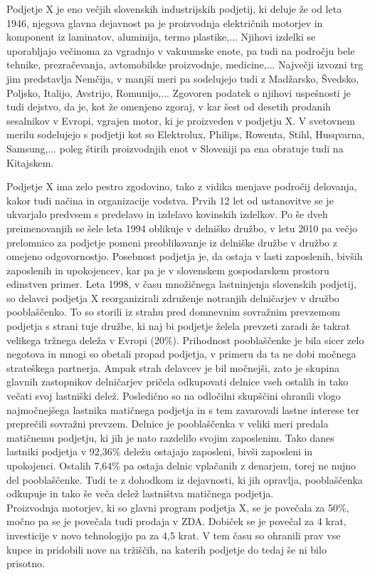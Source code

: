 \documentclass[12pt,a4paper]{amsart}
\theoremstyle{definition} %
\theoremstyle{plain} %
\begin{document}
Podjetje X je eno večjih slovenskih industrijskih podjetij, ki deluje že od leta 1946, njegova glavna dejavnost pa je proizvodnja električnih motorjev in komponent iz laminatov, aluminija, termo plastike,... Njihovi izdelki se uporabljajo večinoma za vgradnjo v vakuumske enote, pa tudi na področju bele tehnike, prezračevanja, avtomobilske proizvodnje, medicine,...
Največji izvozni trg jim predstavlja Nemčija, v manjši meri pa sodelujejo tudi z Madžarsko, Švedsko, Poljsko, Italijo, Avstrijo, Romunijo,... Zgovoren podatek o njihovi uspešnosti je tudi dejstvo, da je, kot že omenjeno zgoraj, v kar šest od desetih prodanih sesalnikov v Evropi, vgrajen motor, ki je proizveden v podjetju X. V svetovnem merilu sodelujejo s podjetji kot so Elektrolux, Philips, Rowenta, Stihl, Husqvarna, Samsung,... poleg štirih proizvodnjih enot v Sloveniji pa ena obratuje tudi na Kitajskem.\par
Podjetje X ima zelo pestro zgodovino, tako z vidika menjave področij delovanja, kakor tudi načina in organizacije vodstva. Prvih 12 let od ustanovitve se je ukvarjalo predvsem s predelavo in izdelavo kovinskih izdelkov. Po še dveh preimenovanjih se šele leta 1994 oblikuje v delniško družbo, v letu 2010 pa večjo prelomnico za podjetje pomeni preoblikovanje iz delniške družbe v družbo z omejeno odgovornostjo. Posebnost podjetja je, da ostaja v lasti zaposlenih, bivših zaposlenih in upokojencev, kar pa je v slovenskem gospodarskem prostoru edinstven primer. Leta 1998, v času množičnega lastninjenja slovenskih podjetij, so delavci podjetja X reorganizirali združenje notranjih delničarjev v družbo pooblaščenko. To so storili iz strahu pred domnevnim sovražnim prevzemom podjetja s strani tuje družbe, ki naj bi podjetje želela prevzeti zaradi že takrat velikega tržnega deleža v Evropi (20\%). Prihodnost pooblaščenke je bila sicer zelo negotova in mnogi so obetali propad podjetja, v primeru da ta ne dobi močnega strateškega partnerja. Ampak strah delavcev je bil močnejši, zato je skupina glavnih zastopnikov delničarjev pričela odkupovati delnice vseh ostalih in tako večati svoj lastniški delež. Posledično so na odločilni skupščini ohranili vlogo najmočnejšega lastnika matičnega podjetja in s tem zavarovali lastne interese ter preprečili sovražni prevzem. Delnice je pooblaščenka v veliki meri predala matičnemu podjetju, ki jih je nato razdelilo svojim zaposlenim. Tako danes lastniki podjetja v 92,36\% deležu ostajajo zaposleni, bivši zaposleni in upokojenci. Ostalih 7,64\% pa ostaja delnic vplačanih z denarjem, torej ne nujno del pooblaščenke. Tudi te z dohodkom iz dejavnosti, ki jih opravlja, pooblaščenka odkupuje in tako še veča delež lastništva matičnega podjetja. \\
Proizvodnja motorjev, ki so glavni program podjetja X, se je povečala za 50\%, močno pa se je povečala tudi prodaja v ZDA. Dobiček se je povečal za 4 krat, investicije v novo tehnologijo pa za 4,5 krat. V tem času so ohranili prav vse kupce in pridobili nove na tržiščih, na katerih podjetje do tedaj še ni bilo prisotno.
\end{document}
